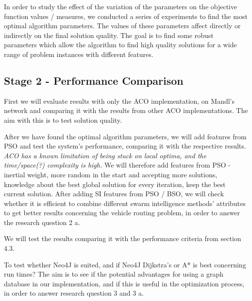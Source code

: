 In order to study the effect of the variation of the parameters on the objective function values / measures, we conducted a series of experiments to find the most optimal algorithm parameters. The values of these parameters affect directly or indirectly on the final solution quality. The goal is to find some robust parameters which allow the algorithm to find high quality solutions for a wide range of problem instances with different features. 

\subsection{Stage 2 - Performance Comparison}

First we will evaluate results with only the ACO implementation, on Mandl's network and comparing it with the results from other ACO implementations. The aim with this is to test solution quality.

After we have found the optimal algorithm parameters, we will add features from PSO and test the system's performance, comparing it with the respective results. \emph{\color{red}ACO has a known limitation of being stuck on local optima, and the time/space(?) complexity is high.} We will therefore 
add features from PSO - inertial weight, more random in the start and accepting more solutions, knowledge about the best global solution for every iteration, keep the best current solution. After adding SI features from PSO / BSO, we will check whether it is efficient to combine different swarm intelligence methods' attributes to get better results concerning the vehicle routing problem, in order to answer the research question 2 a.

We will test the results comparing it with the performance criteria from section 4.3.

To test whether Neo4J is suited, and if Neo4J Dijkstra's or A* is best concerning run times? The aim is to see if the potential advantages for using a graph database in our implementation, and if this is useful in the optimization process, in order to answer research question 3 and 3 a.





